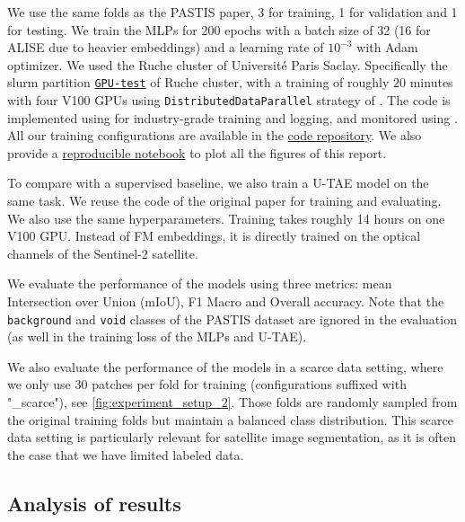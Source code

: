 \documentclass[11pt]{article}
\begin{document}
We use the same folds as the PASTIS paper, 3 for training, 1 for
validation and 1 for testing.
We train the MLPs for 200 epochs with a batch size of 32 (16 for
ALISE due to heavier embeddings) and a
learning rate of $10^{-3}$ with Adam optimizer.
We used the Ruche cluster of Université Paris Saclay.
Specifically the slurm partition
\href{https://mesocentre.pages.centralesupelec.fr/user_doc/ruche/07_slurm_partitions_description/#gpu-partition}{\texttt{GPU-test}}
of Ruche cluster, with a training of roughly 20 minutes with four
V100 GPUs using \texttt{DistributedDataParallel} strategy of
\cite{Ansel_PyTorch_2_Faster_2024}.
The code is implemented using \cite{Falcon_PyTorch_Lightning_2019}
for industry-grade training and logging, and monitored using \cite{wandb}.
All our training configurations are available in the
\href{https://github.com/mva-ii/Benchmarking-foundation-models-for-satellite-image-segmentation/blob/614817109e039c89d7eac0b920437a4704235b2d/configurations}{code
repository}.
We also provide a
\href{https://github.com/mva-ii/Benchmarking-foundation-models-for-satellite-image-segmentation/blob/614817109e039c89d7eac0b920437a4704235b2d/notebooks/results.ipynb}{reproducible
notebook} to plot all the figures of this report.

To compare with a supervised baseline, we also train a U-TAE model on
the same task. We reuse the code of the original
paper for training and evaluating. We also use the same
hyperparameters.
Training takes roughly 14 hours on
one V100 GPU. Instead of FM embeddings, it is directly trained on the
optical channels of the Sentinel-2 satellite.

We evaluate the performance of the models using three metrics: mean
Intersection over Union (mIoU), F1 Macro and Overall accuracy. Note
that the \texttt{background} and \texttt{void} classes of the
PASTIS dataset are
ignored in the evaluation (as well in the training loss of the MLPs
and U-TAE).

We also evaluate the performance of the models in a scarce data setting,
where we only use 30 patches per fold for training (configurations
suffixed with "\_scarce"), see \autoref{fig:experiment_setup_2}.
Those folds are
randomly sampled from the original training folds but maintain a balanced
class distribution.
This scarce data setting is particularly relevant for satellite image
segmentation, as it is often the case that we have limited labeled data.

\subsection{Analysis of results}
\end{document}
